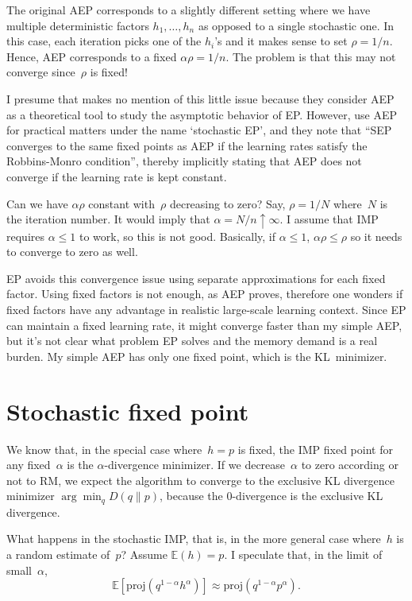 \documentclass{article}
\begin{document}
The original AEP corresponds to a slightly different setting where we have multiple deterministic factors $h_1,\ldots,h_n$ as opposed to a single stochastic one. In this case, each iteration picks one of the $h_i$'s and it makes sense to set $\rho=1/n$.  Hence, AEP corresponds to a fixed $\alpha\rho=1/n$. The problem is that this may not converge since~$\rho$ is fixed!

I presume that \cite{Dehaene-18} makes no mention of this little issue because they consider AEP as a theoretical tool to study the asymptotic behavior of EP. However, \cite{Li-15} use AEP for practical matters under the name `stochastic EP', and they note that ``SEP converges to the same fixed points as AEP if the learning rates satisfy the Robbins-Monro condition'', thereby implicitly stating that AEP does not converge if the learning rate is kept constant.

Can we have $\alpha\rho$ constant with~$\rho$ decreasing to zero? Say, $\rho=1/N$ where~$N$ is the iteration number. It would imply that $\alpha = N/n \uparrow \infty$. I assume that IMP requires $\alpha \leq 1$ to work, so this is not good. Basically, if $\alpha\leq 1$, $\alpha\rho\leq \rho$ so it needs to converge to zero as well.

EP avoids this convergence issue using separate approximations for each fixed factor. Using fixed factors is not enough, as AEP proves, therefore one wonders if fixed factors have any advantage in realistic large-scale learning context. Since EP can maintain a fixed learning rate, it might converge faster than my simple AEP, but it's not clear what problem EP solves and the memory demand is a real burden. My simple AEP has only one fixed point, which is the KL~minimizer. 

\section{Stochastic fixed point}

We know that, in the special case where~$h=p$ is fixed, the IMP fixed point for any fixed~$\alpha$ is the $\alpha$-divergence minimizer. If we decrease~$\alpha$ to zero according or not to RM, we expect the algorithm to converge to the exclusive KL divergence minimizer $\arg\min_q D(q\|p)$, because the 0-divergence is the exclusive KL divergence.

What happens in the stochastic IMP, that is, in the more general case where~$h$ is a random estimate of~$p$? Assume $\mathbb{E}(h)=p$. I speculate that, in the limit of small~$\alpha$,
$$
\mathbb{E}[\text{proj}(q^{1-\alpha}h^\alpha)]
\approx \text{proj}(q^{1-\alpha}p^\alpha).
$$
\end{document}
